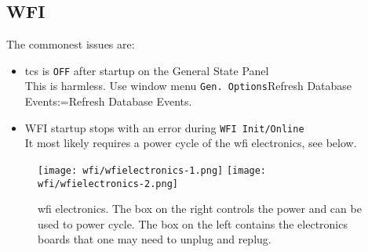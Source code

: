 \documentclass[11pt,fleqn,a4paper]{book}
\makeatletter
\def\menu#1#2{\texttt{#1}\ifx{}#2\else\@for\@x:=#2\do{$\rightarrow$\texttt{\@x}}\fi}
\def\wmenu#1#2{window menu \menu{#1}{#2}}
\makeatother
\begin{document}
\subsection{WFI}

The commonest issues are:
\begin{itemize}
  \item \gls{tcs} is \texttt{OFF} after startup on the \gls{General State} Panel\\
   This is harmless. Use \wmenu{Gen. Options}{Refresh Database Events}.
  \item WFI startup stops with an error during \texttt{WFI Init/Online}\\
       It most likely requires a \gls{power cycle} of the \gls{wfi} electronics, see below.
\end{itemize}

\begin{figure}[ht]
	\texttt{[image: wfi/wfielectronics-1.png]}
	\linewidth
	\texttt{[image: wfi/wfielectronics-2.png]}
	\caption[WFI electronics: \gls{power cycle} button and boards]{\gls{wfi} electronics.  The box on the right controls the power and can be used to power cycle.
The box on the left contains the electronics boards that one may need to unplug and replug.}
	\label{fig:wfielectronics}
\end{figure}
\end{document}
